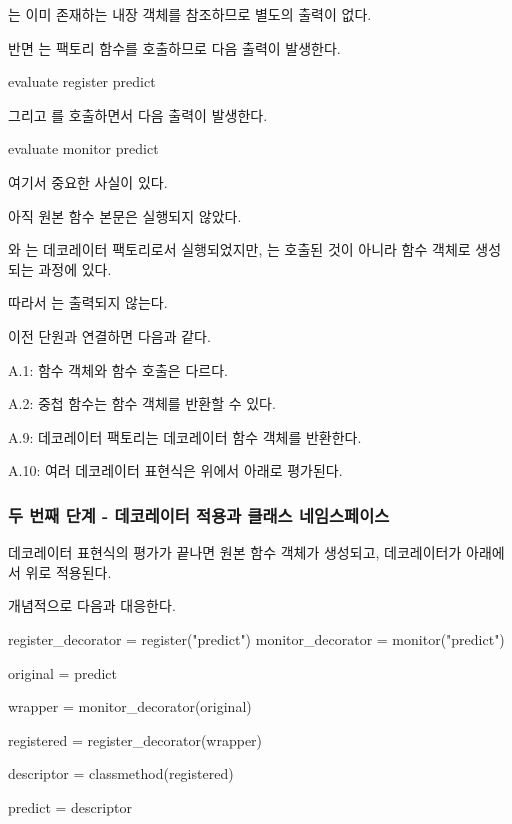 는 이미 존재하는 내장 객체를 참조하므로 별도의 출력이 없다.

반면 는 팩토리 함수를 호출하므로 다음 출력이 발생한다.

\begin{dhkzsh}
evaluate register predict
\end{dhkzsh}

그리고 를 호출하면서 다음 출력이 발생한다.

\begin{dhkzsh}
evaluate monitor predict
\end{dhkzsh}

여기서 중요한 사실이 있다.

아직 원본  함수 본문은 실행되지 않았다.

와 는 데코레이터 팩토리로서 실행되었지만, 는 호출된 것이 아니라 함수 객체로 생성되는 과정에 있다.

따라서 는 출력되지 않는다.

이전 단원과 연결하면 다음과 같다.

\begin{dhksmry}
    A.1: 함수 객체와 함수 호출은 다르다.

    A.2: 중첩 함수는 함수 객체를 반환할 수 있다.

    A.9: 데코레이터 팩토리는 데코레이터 함수 객체를 반환한다.

    A.10: 여러 데코레이터 표현식은 위에서 아래로 평가된다.
\end{dhksmry}

\subsubsection{두 번째 단계 - 데코레이터 적용과 클래스 네임스페이스}

데코레이터 표현식의 평가가 끝나면 원본  함수 객체가 생성되고, 데코레이터가 아래에서 위로 적용된다.

개념적으로 다음과 대응한다.

\begin{dhkcode}
register_decorator = register("predict")
monitor_decorator = monitor("predict")

original = predict

wrapper = monitor_decorator(original)

registered = register_decorator(wrapper)

descriptor = classmethod(registered)

predict = descriptor
\end{dhkcode}

